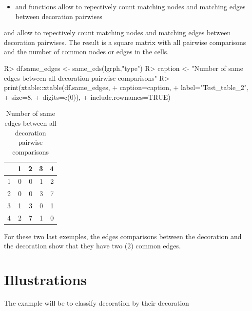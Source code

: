 \documentclass[article]{jss}
\begin{document}
\begin{itemize}
  \item {} and  functions allow to repectively count matching nodes and matching edges between decoration pairwises
\end{itemize}

 and  allow to repectively count matching nodes and matching edges between decoration pairwises. The result is a square matrix with all pairwise comparisons and the number of common nodes or edges in the cells.

\begin{Schunk}
\begin{Sinput}
R> df.same_edges <- same_eds(lgrph,"type")
R> caption <- "Number of same edges between all decoration pairwise comparisons"
R> print(xtable::xtable(df.same_edges,
+                       caption=caption,
+                       label="Test_table_2",
+                       size=8,
+                       digits=c(0)),
+        include.rownames=TRUE)
\end{Sinput}
\begin{table}[ht]
\centering
\begin{tabular}{rrrrr}
  \hline
 & 1 & 2 & 3 & 4 \\ 
  \hline
1 & 0 & 0 & 1 & 2 \\ 
  2 & 0 & 0 & 3 & 7 \\ 
  3 & 1 & 3 & 0 & 1 \\ 
  4 & 2 & 7 & 1 & 0 \\ 
   \hline
\end{tabular}
\caption{Number of same edges between all decoration pairwise comparisons} 
\label{Test_table_2}
\end{table}\end{Schunk}

For these two last exemples, the edges comparisons between the decoration  and the decoration  show that they have two (2) common edges.


\section{Illustrations} \label{sec:illustrations}

The example will be to classify decoration by their decoration

\end{document}
